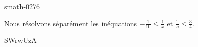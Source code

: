 
\begin{corrige}{smath-0276}

    Nous résolvons séparément les inéquations \( -\frac{1}{ 10 }\leq \frac{1}{ x }\) et \( \frac{1}{ x }\leq\frac{ 3 }{ 4 }\).

    SWrwUzA

\end{corrige}
